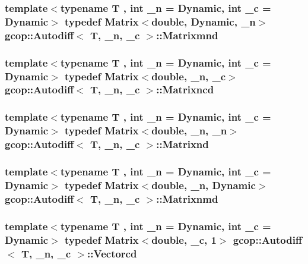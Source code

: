 \subsubsection[{\-Matrixmnd}]{\setlength{\rightskip}{0pt plus 5cm}template$<$typename T , int \-\_\-n = \-Dynamic, int \-\_\-c = \-Dynamic$>$ typedef \-Matrix$<$double, \-Dynamic, \-\_\-n$>$ {\bf gcop\-::\-Autodiff}$<$ \-T, \-\_\-n, \-\_\-c $>$\-::{\bf \-Matrixmnd}}\label{classgcop_1_1Autodiff_a9232bc6489c99198b2dbe52d903522af}
\subsubsection[{\-Matrixncd}]{\setlength{\rightskip}{0pt plus 5cm}template$<$typename T , int \-\_\-n = \-Dynamic, int \-\_\-c = \-Dynamic$>$ typedef \-Matrix$<$double, \-\_\-n, \-\_\-c$>$ {\bf gcop\-::\-Autodiff}$<$ \-T, \-\_\-n, \-\_\-c $>$\-::{\bf \-Matrixncd}}\label{classgcop_1_1Autodiff_afce1394afb09e25cb5c48046faff5806}
\subsubsection[{\-Matrixnd}]{\setlength{\rightskip}{0pt plus 5cm}template$<$typename T , int \-\_\-n = \-Dynamic, int \-\_\-c = \-Dynamic$>$ typedef \-Matrix$<$double, \-\_\-n, \-\_\-n$>$ {\bf gcop\-::\-Autodiff}$<$ \-T, \-\_\-n, \-\_\-c $>$\-::{\bf \-Matrixnd}}\label{classgcop_1_1Autodiff_a51c944a10db9886386bf4f60ca21ba92}
\subsubsection[{\-Matrixnmd}]{\setlength{\rightskip}{0pt plus 5cm}template$<$typename T , int \-\_\-n = \-Dynamic, int \-\_\-c = \-Dynamic$>$ typedef \-Matrix$<$double, \-\_\-n, \-Dynamic$>$ {\bf gcop\-::\-Autodiff}$<$ \-T, \-\_\-n, \-\_\-c $>$\-::{\bf \-Matrixnmd}}\label{classgcop_1_1Autodiff_a11f7a900564fad073f5849bf931512c9}
\subsubsection[{\-Vectorcd}]{\setlength{\rightskip}{0pt plus 5cm}template$<$typename T , int \-\_\-n = \-Dynamic, int \-\_\-c = \-Dynamic$>$ typedef \-Matrix$<$double, \-\_\-c, 1$>$ {\bf gcop\-::\-Autodiff}$<$ \-T, \-\_\-n, \-\_\-c $>$\-::{\bf \-Vectorcd}}\label{classgcop_1_1Autodiff_a7d3bdaa3aae6770fde2ba7fde48e596f}
